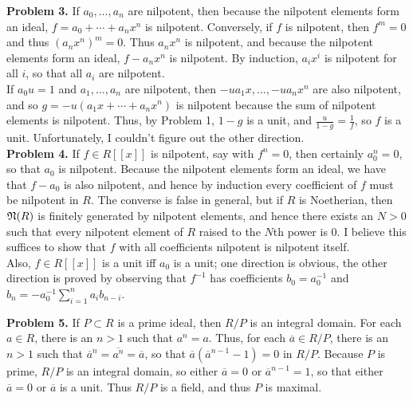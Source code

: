 \documentclass[11pt]{article}
\newcommand{\num}[1]{\noindent \textbf{#1}}
\theoremstyle{definition}
\begin{document}
\num{Problem 3.} If $a_0,\ldots,a_n$ are nilpotent, then because the nilpotent elements form an ideal, $f=a_0+\cdots+a_nx^n$ is nilpotent. Conversely, if $f$ is nilpotent, then $f^m=0$ and thus $(a_nx^n)^m=0$. Thus $a_nx^n$ is nilpotent, and because the nilpotent elements form an ideal, $f-a_nx^n$ is nilpotent. By induction, $a_ix^i$ is nilpotent for all $i$, so that all $a_i$ are nilpotent.\\

If $a_0u=1$ and $a_1,\ldots,a_n$ are nilpotent, then $-ua_1x,\ldots,-ua_nx^n$ are also nilpotent, and so $g=-u(a_1x+\cdots+a_nx^n)$ is nilpotent because the sum of nilpotent elements is nilpotent. Thus, by Problem 1, $1-g$ is a unit, and $\frac{u}{1-g}=\frac{1}{f}$, so $f$ is a unit. Unfortunately, I couldn't figure out the other direction.    \\

\num{Problem 4.} If $f\in R[[x]]$ is nilpotent, say with $f^n=0$, then certainly $a_0^n=0$, so that $a_0$ is nilpotent. Because the nilpotent elements form an ideal, we have that $f-a_0$ is also nilpotent, and hence by induction every coefficient of $f$ must be nilpotent in $R$. The converse is false in general, but if $R$ is Noetherian, then $\frak{N}(R)$ is finitely generated by nilpotent elements, and hence there exists an $N>0$ such that every nilpotent element of $R$ raised to the $N$th power is 0. I believe this suffices to show that $f$ with all coefficients nilpotent is nilpotent itself. \\

Also, $f\in R[[x]]$ is a unit iff $a_0$ is a unit; one direction is obvious, the other direction is proved by observing that $f^{-1}$ has coefficients $b_0=a_0^{-1}$ and $b_n=-a_0^{-1}\sum_{i=1}^n a_ib_{n-i}$.    \\

\pagebreak

\num{Problem 5.} If $P\subset R$ is a prime ideal, then $R/P$ is an integral domain. For each $a\in R$, there is an $n>1$ such that $a^n=a$. Thus, for each $\overline{a}\in R/P$, there is an $n>1$ such that $\overline{a}^n=\overline{a^n}=\overline{a}$, so that $\overline{a}(\overline{a}^{n-1}-1)=0$ in $R/P$. Because $P$ is prime, $R/P$ is an integral domain, so either $\overline{a}=0$ or $\overline{a}^{n-1}=1$, so that either $\overline{a}=0$ or $\overline{a}$ is a unit. Thus $R/P$ is a field, and thus $P$ is maximal. \\
\end{document}

